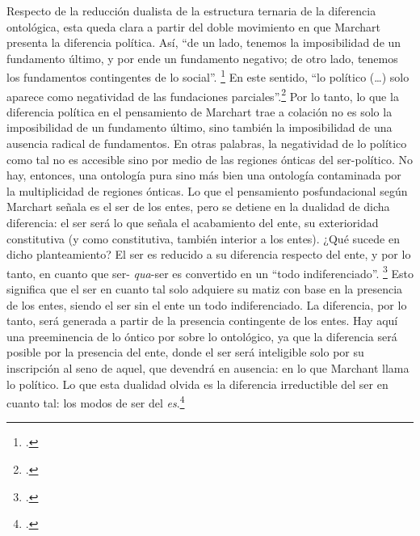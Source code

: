Respecto de la reducción dualista de la estructura ternaria de la diferencia ontológica, esta queda clara a partir del doble movimiento en que Marchart presenta la diferencia política. Así, \enquote{de un lado, tenemos la imposibilidad de un fundamento último, y por ende un fundamento negativo; de otro lado, tenemos los fundamentos contingentes de lo social}. \footcite[179]{@7074-BISET2010} En este sentido, \enquote{lo político (\ldots) solo aparece como negatividad de las fundaciones parciales}.\footcite{@7074-BISET2010} Por lo tanto, lo que la diferencia política en el pensamiento de Marchart trae a colación no es solo la imposibilidad de un fundamento último, sino también la imposibilidad de una ausencia radical de fundamentos. En otras palabras, la negatividad de lo político como tal no es accesible sino por medio de las regiones ónticas del ser-político. No hay, entonces, una ontología pura sino más bien una ontología contaminada por la multiplicidad de regiones ónticas. Lo que el pensamiento posfundacional según Marchart señala es el ser de los entes, pero se detiene en la dualidad de dicha diferencia: el ser será lo que señala el acabamiento del ente, su exterioridad constitutiva (y como constitutiva, también interior a los entes). ¿Qué sucede en dicho planteamiento? El ser es reducido a su diferencia respecto del ente, y por lo tanto, en cuanto que ser- \emph{qua}-ser es convertido en un \enquote{todo indiferenciado}. \footcite[184]{@7074-BISET2010} Esto significa que el ser en cuanto tal solo adquiere su matiz  con base en la presencia de los entes, siendo el ser sin el ente un todo indiferenciado. La diferencia, por lo tanto, será generada a partir de la presencia contingente de los entes. Hay aquí una preeminencia de lo óntico por sobre lo ontológico, ya que la diferencia será posible por la presencia del ente, donde el ser será inteligible solo por su inscripción al seno de aquel, que devendrá en ausencia: en lo que Marchant llama lo político. Lo que esta dualidad olvida es la diferencia irreductible del ser en cuanto tal: los modos de ser del \emph{es}.\footcite{@7074-BISET2010}

